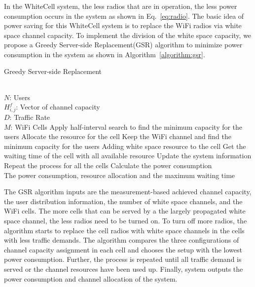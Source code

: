 In the WhiteCell system, the less radios that are in operation, the less power consumption occurs 
in the system as shown in Eq.~\ref{eq:radio}. 
The basic idea of power saving for this WhiteCell system is to replace the WiFi radios via 
white space channel capacity. To implement the division of the white space capacity, we propose a 
Greedy Server-side Replacement(GSR) algorithm to minimize power consumption in the system 
as shown in Algorithm~\ref{algorithm:gsr}. 

\begin{algorithm}[t]
\small
\caption{Greedy Server-side Replacement}
\label{algorithm:gsr}
\begin{algorithmic}[1]
\REQUIRE  ~~\\
$N$: Users\\
$H_{i,j}^f$: Vector of channel capacity\\
$D$: Traffic Rate\\
$M$: WiFi Cells
\STATE Apply half-interval search to find the minimum capacity for the users
\STATE Allocate the resource for the cell
\STATE Keep the WiFi channel and find the minimum capacity for the users
\STATE Adding white space resource to the cell
\ENDIF
\ELSE 
\STATE Get the waiting time of the cell with all available resource
\ENDIF
\STATE Update the system information
\STATE Repeat the process for all the cells
\STATE Calculate the power consumption
\ENSURE ~~\\
The power consumption, resource allocation and the maximum waiting time\\
\end{algorithmic}
\end{algorithm}

The GSR algorithm inputs are the measurement-based achieved channel capacity, the user distribution 
information, the number of white space channels, and the WiFi cells. 
The more cells that can be served by a the largely propagated white space channel, the less radios need to 
be turned on.
To turn off more radios, the algorithm starts to replace the cell radios with white space channels in the 
cells with less traffic demands.
The algorithm compares the three configurations of channel capacity assignment in each cell and chooses the 
setup with the lowest power consumption. Further, the process is repeated until all traffic demand is served or the 
channel resources have been used up.
Finally, system outputs the power consumption and channel allocation of the system.

